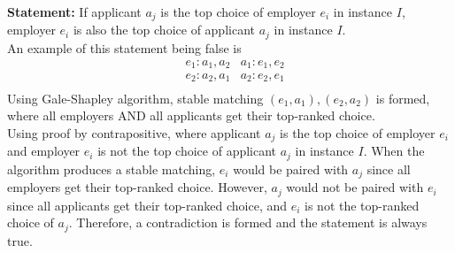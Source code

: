 \documentclass[11pt,fleqn]{exam}
\newif\ifsolutions\solutionsfalse
\newenvironment{soln}{\color{solnblue}}{}
\begin{document}
\begin{questions}
\noindent
{\bf Statement:}  
If applicant $a_j$ is the top choice of employer $e_i$ in instance $I$, employer $e_i$ is also the top choice of applicant $a_j$ in instance $I$.
\\
\begin{soln}
An example of this statement being false is
    \begin{align*}
        & e_1: a_1, a_2 & a_1: e_1, e_2  \\
        & e_2: a_2, a_1 & a_2: e_2, e_1  \\
    \end{align*}
    Using Gale-Shapley algorithm, stable matching $(e_1, a_1), (e_2, a_2)$ is formed, where all employers AND all applicants get their top-ranked choice. \\
    Using proof by contrapositive, where applicant $a_j$ is the top choice of employer $e_i$ and employer $e_i$ is not the top choice of applicant $a_j$ in instance $I$. When the algorithm produces a stable matching, $e_i$ would be paired with $a_j$ since all employers get their top-ranked choice. However, $a_j$ would not be paired with $e_i$ since all applicants get their top-ranked choice, and $e_i$ is not the top-ranked choice of $a_j$. Therefore, a contradiction is formed and the statement is always true.
\end{soln}
\ifsolutions

\else
\fi
\end{questions}

\clearpage
    
\end{document}
